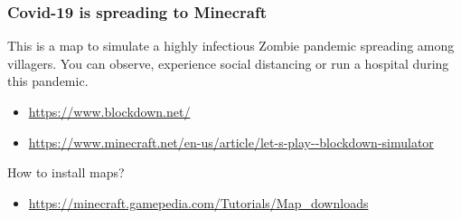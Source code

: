 \documentclass[
]{article}
\providecommand{\tightlist}{%
  \setlength{\itemsep}{0pt}\setlength{\parskip}{0pt}}
\begin{document}
\hypertarget{covid-19-is-spreading-to-minecraft}{%
\subsubsection{Covid-19 is spreading to
Minecraft}\label{covid-19-is-spreading-to-minecraft}}

This is a map to simulate a highly infectious Zombie pandemic spreading
among villagers. You can observe, experience social distancing or run a
hospital during this pandemic.

\begin{itemize}
\item
  \url{https://www.blockdown.net/}
\item
  \url{https://www.minecraft.net/en-us/article/let-s-play--blockdown-simulator}
\end{itemize}

How to install maps?

\begin{itemize}
\tightlist
\item
  \url{https://minecraft.gamepedia.com/Tutorials/Map_downloads}
\end{itemize}
\end{document}

